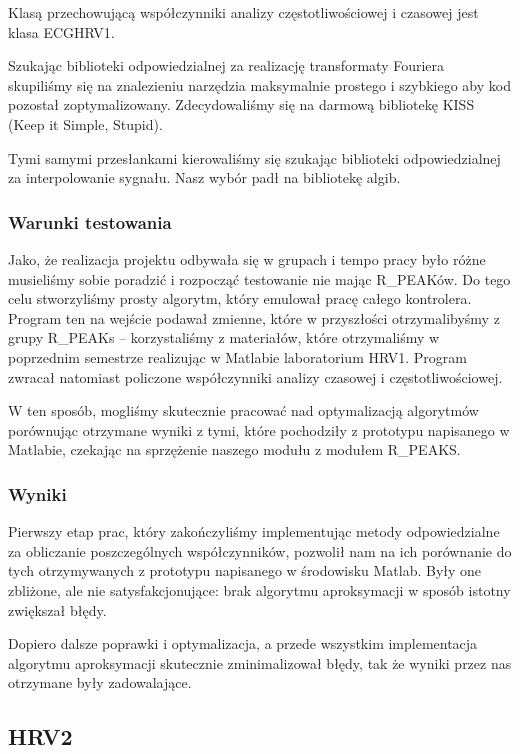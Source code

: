 \documentclass[a4paper, 11pt]{article}
\begin{document}
Klasą przechowującą współczynniki analizy częstotliwościowej i czasowej jest klasa ECGHRV1.

Szukając biblioteki odpowiedzialnej za realizację transformaty Fouriera skupiliśmy się na znalezieniu narzędzia maksymalnie prostego i szybkiego aby kod pozostał zoptymalizowany. Zdecydowaliśmy się na darmową bibliotekę KISS (Keep it Simple, Stupid).

Tymi samymi przesłankami kierowaliśmy się szukając biblioteki odpowiedzialnej za interpolowanie sygnału. Nasz wybór padł na bibliotekę algib.

\subsubsection{Warunki testowania}
\label{sec:hrv1:tests}

Jako, że realizacja projektu odbywała się w grupach i tempo pracy było różne musieliśmy sobie poradzić i rozpocząć testowanie nie mając R\_PEAKów. Do tego celu stworzyliśmy prosty algorytm, który emulował pracę całego kontrolera. Program ten na wejście podawał zmienne, które w przyszłości otrzymalibyśmy z grupy R\_PEAKs  -- korzystaliśmy z materiałów, które otrzymaliśmy w poprzednim semestrze realizując w Matlabie laboratorium HRV1. Program zwracał natomiast policzone współczynniki analizy czasowej i częstotliwościowej.

W ten sposób, mogliśmy skutecznie pracować nad optymalizacją algorytmów porównując otrzymane wyniki z tymi, które pochodziły z prototypu napisanego w Matlabie, czekając na sprzężenie naszego modułu z modułem R\_PEAKS.

\subsubsection{Wyniki}
\label{sec:hrv1:results}
Pierwszy etap prac, który zakończyliśmy implementując metody odpowiedzialne za obliczanie poszczególnych współczynników, pozwolił nam na ich porównanie do tych otrzymywanych z prototypu napisanego w środowisku Matlab. Były one zbliżone, ale nie satysfakcjonujące: brak algorytmu aproksymacji w sposób istotny zwiększał błędy.

Dopiero dalsze poprawki i optymalizacja, a przede wszystkim implementacja algorytmu aproksymacji skutecznie zminimalizował błędy, tak że wyniki przez nas otrzymane były zadowalające.


\subsection{HRV2}
\label{sec:hrv2}
\end{document}
